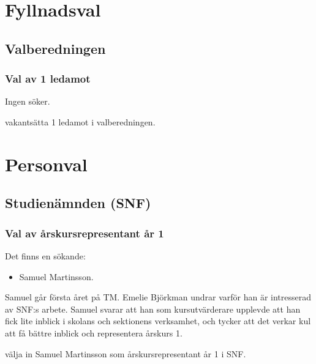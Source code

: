 \documentclass[hidelinks]{../sektionsmote} %
\begin{document}
\section{Fyllnadsval}

\subsection{Valberedningen}

\subsubsection{Val av 1 ledamot}
Ingen söker.
\begin{beslut}
    \item vakantsätta 1 ledamot i valberedningen.
\end{beslut}


\section{Personval}

\subsection{Studienämnden (SNF)}

\subsubsection{Val av årskursrepresentant år 1}
Det finns en sökande:
\begin{itemize}
    \item Samuel Martinsson.
\end{itemize}

Samuel går första året på TM.
Emelie Björkman undrar varför han är intresserad av SNF:s arbete.
Samuel svarar att han som kursutvärderare upplevde att han fick lite inblick i skolans och sektionens verksamhet, och tycker att det verkar kul att få bättre inblick och representera årskurs 1.
\begin{beslut}
    \item välja in Samuel Martinsson som årskursrepresentant år 1 i SNF.
\end{beslut}
\end{document}
